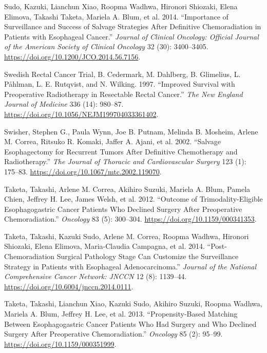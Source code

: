 \documentclass[
  letterpaper,
]{scrbook}
\newlength{\cslhangindent}
\newenvironment{CSLReferences}[2] %
 {\begin{list}{}{%
  \setlength{\itemindent}{0pt}
  \setlength{\leftmargin}{0pt}
  \setlength{\parsep}{0pt}
  \ifodd #1
   \setlength{\leftmargin}{\cslhangindent}
   \setlength{\itemindent}{-1\cslhangindent}
  \fi
  \setlength{\itemsep}{#2\baselineskip}}}
 {\end{list}}
\begin{document}
\begin{CSLReferences}{1}{0}
Sudo, Kazuki, Lianchun Xiao, Roopma Wadhwa, Hironori Shiozaki, Elena
Elimova, Takashi Taketa, Mariela A. Blum, et al. 2014. {``Importance of
Surveillance and Success of Salvage Strategies After Definitive
Chemoradiation in Patients with Esophageal Cancer.''} \emph{Journal of
Clinical Oncology: Official Journal of the American Society of Clinical
Oncology} 32 (30): 3400--3405.
\url{https://doi.org/10.1200/JCO.2014.56.7156}.

Swedish Rectal Cancer Trial, B. Cedermark, M. Dahlberg, B. Glimelius, L.
Påhlman, L. E. Rutqvist, and N. Wilking. 1997. {``Improved Survival with
Preoperative Radiotherapy in Resectable Rectal Cancer.''} \emph{The New
England Journal of Medicine} 336 (14): 980--87.
\url{https://doi.org/10.1056/NEJM199704033361402}.

Swisher, Stephen G., Paula Wynn, Joe B. Putnam, Melinda B. Mosheim,
Arlene M. Correa, Ritsuko R. Komaki, Jaffer A. Ajani, et al. 2002.
{``Salvage Esophagectomy for Recurrent Tumors After Definitive
Chemotherapy and Radiotherapy.''} \emph{The Journal of Thoracic and
Cardiovascular Surgery} 123 (1): 175--83.
\url{https://doi.org/10.1067/mtc.2002.119070}.

Taketa, Takashi, Arlene M. Correa, Akihiro Suzuki, Mariela A. Blum,
Pamela Chien, Jeffrey H. Lee, James Welsh, et al. 2012. {``Outcome of
Trimodality-Eligible Esophagogastric Cancer Patients Who Declined
Surgery After Preoperative Chemoradiation.''} \emph{Oncology} 83 (5):
300--304. \url{https://doi.org/10.1159/000341353}.

Taketa, Takashi, Kazuki Sudo, Arlene M. Correa, Roopma Wadhwa, Hironori
Shiozaki, Elena Elimova, Maria-Claudia Campagna, et al. 2014.
{``Post-Chemoradiation Surgical Pathology Stage Can Customize the
Surveillance Strategy in Patients with Esophageal Adenocarcinoma.''}
\emph{Journal of the National Comprehensive Cancer Network: JNCCN} 12
(8): 1139--44. \url{https://doi.org/10.6004/jnccn.2014.0111}.

Taketa, Takashi, Lianchun Xiao, Kazuki Sudo, Akihiro Suzuki, Roopma
Wadhwa, Mariela A. Blum, Jeffrey H. Lee, et al. 2013.
{``Propensity-Based Matching Between Esophagogastric Cancer Patients Who
Had Surgery and Who Declined Surgery After Preoperative
Chemoradiation.''} \emph{Oncology} 85 (2): 95--99.
\url{https://doi.org/10.1159/000351999}.


\end{CSLReferences}
\end{document}
